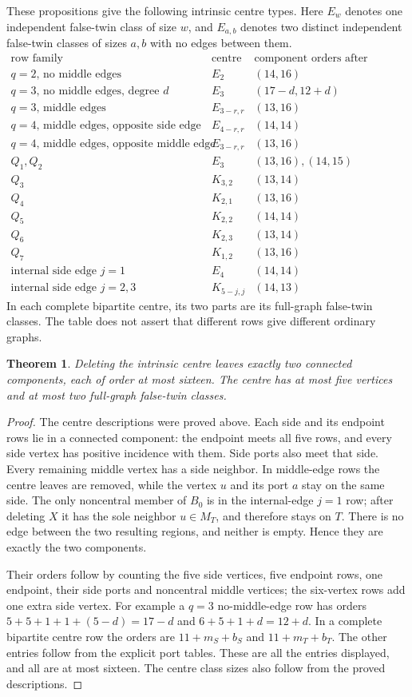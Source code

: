 \documentclass[11pt]{article}
\newtheorem{theorem}{Theorem}
\begin{document}
These propositions give the following intrinsic centre types. Here $E_w$
denotes one independent false-twin class of size $w$, and $E_{a,b}$
denotes two distinct independent false-twin classes of sizes $a,b$ with
no edges between them.
\[
\begin{array}{c|c|c}
\text{row family}&\text{centre}&\text{component orders after deletion}\\\hline
q=2\text{, no middle edges}&E_2&(14,16)\\
q=3\text{, no middle edges, degree }d&E_3&(17-d,12+d)\\
q=3\text{, middle edges}&E_{3-r,r}&(13,16)\\
q=4\text{, middle edges, opposite side edge}&E_{4-r,r}&(14,14)\\
q=4\text{, middle edges, opposite middle edge}&E_{3-r,r}&(13,16)\\
Q_1,Q_2&E_3&(13,16),(14,15)\\
Q_3&K_{3,2}&(13,14)\\
Q_4&K_{2,1}&(13,16)\\
Q_5&K_{2,2}&(14,14)\\
Q_6&K_{2,3}&(13,14)\\
Q_7&K_{1,2}&(13,16)\\
\text{internal side edge }j=1&E_4&(14,14)\\
\text{internal side edge }j=2,3&K_{5-j,j}&(14,13)
\end{array}
\]
In each complete bipartite centre, its two parts are its full-graph
false-twin classes. The table does not assert that different rows give
different ordinary graphs.

\begin{theorem}\label{decompose}
Deleting the intrinsic centre leaves exactly two connected components,
each of order at most sixteen. The centre has at most five vertices and
at most two full-graph false-twin classes.
\end{theorem}
\begin{proof}
The centre descriptions were proved above. Each side and its endpoint
rows lie in a connected component: the endpoint meets all five rows,
and every side vertex has positive incidence with them. Side ports
also meet that side. Every remaining middle vertex has a side neighbor.
In middle-edge rows the centre leaves are removed, while the vertex
$u$ and its port $a$ stay on the same side. The only noncentral member
of $B_0$ is in the internal-edge $j=1$ row; after deleting $X$ it has
the sole neighbor $u\in M_T$, and therefore stays on $T$.
There is no edge between the two resulting regions, and neither is
empty. Hence they are exactly the two components.

Their orders follow by counting the five side vertices, five endpoint
rows, one endpoint, their side ports and noncentral middle vertices;
the six-vertex rows add one extra side vertex. For example a $q=3$
no-middle-edge row has orders $5+5+1+1+(5-d)=17-d$ and
$6+5+1+d=12+d$. In a complete bipartite centre row the orders are
$11+m_S+b_S$ and $11+m_T+b_T$. The other entries follow from the
explicit port tables. These are all the entries displayed, and all
are at most sixteen. The centre class sizes also follow from the
proved descriptions.
\end{proof}
\end{document}
